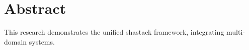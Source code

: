 \section*{Abstract}
This research demonstrates the unified shastack framework, integrating multi-domain systems.

